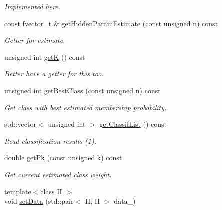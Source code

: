 \begin{DoxyCompactItemize}
\begin{DoxyCompactList}\small\item\em Implemented here. \item\end{DoxyCompactList}\item 
const fvector\_\-t \& \hyperlink{classCDA_1_1FitMulticlassByEM_a62588d5a6dcc8bc7af432b26ee5be5ab}{getHiddenParamEstimate} (const unsigned n) const 
\begin{DoxyCompactList}\small\item\em Getter for estimate. \item\end{DoxyCompactList}\item 
\hypertarget{classCDA_1_1FitMulticlassByEM_a0c70d98a25e259ef610faab0f376ed38}{
unsigned int \hyperlink{classCDA_1_1FitMulticlassByEM_a0c70d98a25e259ef610faab0f376ed38}{getK} () const }
\label{classCDA_1_1FitMulticlassByEM_a0c70d98a25e259ef610faab0f376ed38}

\begin{DoxyCompactList}\small\item\em Better have a getter for this too. \item\end{DoxyCompactList}\item 
unsigned int \hyperlink{classCDA_1_1FitMulticlassByEM_a69d730c94245ec23b9a96cccee951129}{getBestClass} (const unsigned n) const 
\begin{DoxyCompactList}\small\item\em Get class with best estimated membership probability. \item\end{DoxyCompactList}\item 
std::vector$<$ unsigned int $>$ \hyperlink{classCDA_1_1FitMulticlassByEM_a967f5380f84a679ca07f1fd9ac1a9e65}{getClassifList} () const 
\begin{DoxyCompactList}\small\item\em Read classification results (1). \item\end{DoxyCompactList}\item 
double \hyperlink{classCDA_1_1FitMulticlassByEM_a869530b76ee4b40d38d3fb80ea0932aa}{getPk} (const unsigned k) const 
\begin{DoxyCompactList}\small\item\em Get current estimated class weight. \item\end{DoxyCompactList}\item 
\hypertarget{classCDA_1_1FitMulticlassByEM_a7381428ebb707dbdd0553d6bc0e7113b}{
{\footnotesize template$<$class II $>$ }\\void \hyperlink{classCDA_1_1FitMulticlassByEM_a7381428ebb707dbdd0553d6bc0e7113b}{setData} (std::pair$<$ II, II $>$ data\_\-)}
\label{classCDA_1_1FitMulticlassByEM_a7381428ebb707dbdd0553d6bc0e7113b}


\end{DoxyCompactItemize}
